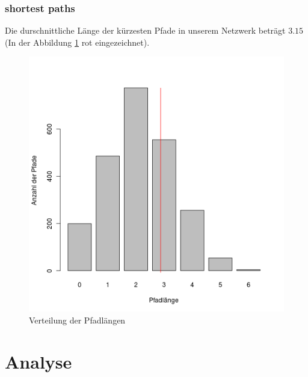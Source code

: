 \documentclass{acm_proc_article-sp}
\begin{document}
\subsubsection{shortest paths}
Die durschnittliche Länge der kürzesten Pfade in unserem Netzwerk beträgt $3.15$(In der Abbildung \ref{fig:paths} rot eingezeichnet). 
\begin{figure}[H]
\centering
\includegraphics[scale=0.55]{../visualization/shortest_path_hist.png}
\caption{Verteilung der Pfadlängen}
\label{fig:paths}
\end{figure}
\newpage
\section{Analyse}
\end{document}
